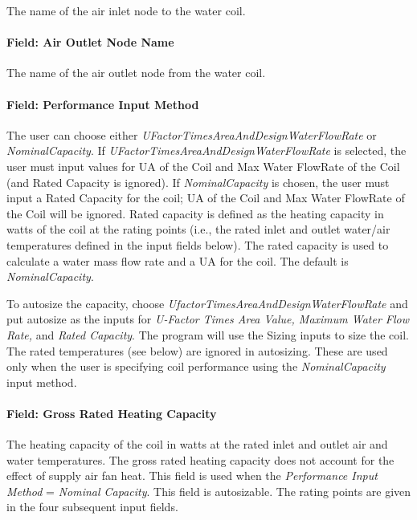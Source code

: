 The name of the air inlet node to the water coil.

\paragraph{Field: Air Outlet Node Name}\label{field-air-outlet-node-name-1-002}

The name of the air outlet node from the water coil.

\paragraph{Field: Performance Input Method}\label{field-performance-input-method-001}

The user can choose either \emph{UFactorTimesAreaAndDesignWaterFlowRate} or \emph{NominalCapacity}. If \emph{UFactorTimesAreaAndDesignWaterFlowRate} is selected, the user must input values for UA of the Coil and Max Water FlowRate of the Coil (and Rated Capacity is ignored). If \emph{NominalCapacity} is chosen, the user must input a Rated Capacity for the coil; UA of the Coil and Max Water FlowRate of the Coil will be ignored. Rated capacity is defined as the heating capacity in watts of the coil at the rating points (i.e., the rated inlet and outlet water/air temperatures defined in the input fields below). The rated capacity is used to calculate a water mass flow rate and a UA for the coil. The default is \emph{NominalCapacity}.

To autosize the capacity, choose \emph{UfactorTimesAreaAndDesignWaterFlowRate} and put autosize as the inputs for \emph{U-Factor Times Area Value, Maximum Water Flow Rate,} and \emph{Rated Capacity}. The program will use the Sizing inputs to size the coil. The rated temperatures (see below) are ignored in autosizing. These are used only when the user is specifying coil performance using the \emph{NominalCapacity} input method.

\paragraph{Field: Gross Rated Heating Capacity}\label{field-gross-rated-heating-capacity}

The heating capacity of the coil in watts at the rated inlet and outlet air and water temperatures. The gross rated heating capacity does not account for the effect of supply air fan heat. This field is used when the \emph{Performance Input Method} = \emph{Nominal Capacity}. This field is autosizable. The rating points are given in the four subsequent input fields.

